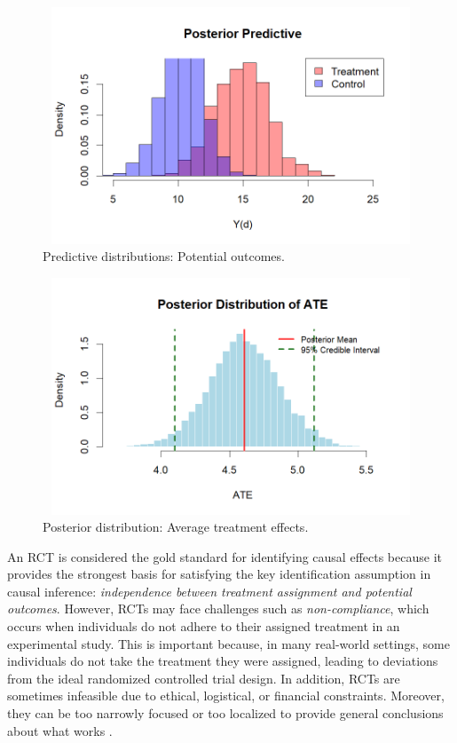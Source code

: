 \begin{figure}
	\includegraphics[width=340pt, height=200pt]{Chapters/chapter12/figures/BasicYd.png}
	\caption[List of figure caption goes here]{Predictive distributions: Potential outcomes.}\label{fig12_0}
\end{figure}


\begin{figure}
	\includegraphics[width=340pt, height=200pt]{Chapters/chapter12/figures/BasicATE.png}
	\caption[List of figure caption goes here]{Posterior distribution: Average treatment effects.}\label{fig12_0a}
\end{figure}


An RCT is considered the gold standard for identifying causal effects because it provides the strongest basis for satisfying the key identification assumption in causal inference: \textit{independence between treatment assignment and potential outcomes}. However, RCTs may face challenges such as \textit{non-compliance}, which occurs when individuals do not adhere to their assigned treatment in an experimental study. This is important because, in many real-world settings, some individuals do not take the treatment they were assigned, leading to deviations from the ideal randomized controlled trial design. In addition, RCTs are sometimes infeasible due to ethical, logistical, or financial constraints. Moreover, they can be too narrowly focused or too localized to provide general conclusions about what works \cite{deaton2010instruments}.


